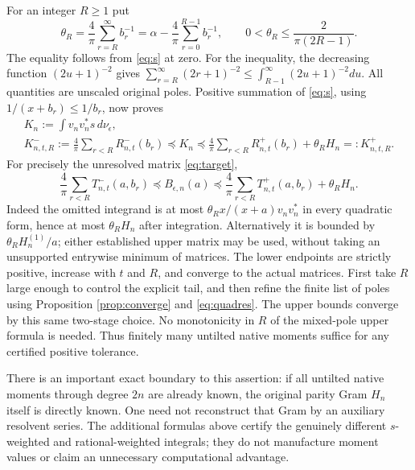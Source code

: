 \documentclass[11pt]{article}
\begin{document}
For an integer $R\ge1$ put
\begin{equation}\label{eq:theta}
 \theta_R=\frac4\pi\sum_{r=R}^\infty b_r^{-1}
 =\alpha-\frac4\pi\sum_{r=0}^{R-1}b_r^{-1},\qquad
 0<\theta_R\le\frac{2}{\pi(2R-1)}.
\end{equation}
The equality follows from \eqref{eq:s} at zero.  For the inequality,
the decreasing function $(2u+1)^{-2}$ gives
$\sum_{r=R}^\infty(2r+1)^{-2}\le\int_{R-1}^\infty(2u+1)^{-2}du$.
All quantities are unscaled original poles.  Positive summation of
\eqref{eq:s}, using $1/(x+b_r)\le1/b_r$, now proves
\begin{equation}\label{eq:tiltKbounds}
 \begin{gathered}
 K_n:=\int v_nv_n^*s\,d\nu_\epsilon,\\
 K_{n,t,R}^-:=\frac4\pi\sum_{r<R}R_{n,t}^-(b_r)
 \preceq K_n\preceq
 \frac4\pi\sum_{r<R}R_{n,t}^+(b_r)+\theta_RH_n
 =:K_{n,t,R}^+.
 \end{gathered}
\end{equation}
For precisely the unresolved matrix \eqref{eq:target},
\begin{equation}\label{eq:tiltBbounds}
 \boxed{\frac4\pi\sum_{r<R}T_{n,t}^-(a,b_r)
 \preceq B_{\epsilon,n}(a)\preceq
 \frac4\pi\sum_{r<R}T_{n,t}^+(a,b_r)+\theta_RH_n.}
\end{equation}
Indeed the omitted integrand is at most
$\theta_R x/(x+a)v_nv_n^*$ in every quadratic form, hence at most
$\theta_RH_n$ after integration.  Alternatively it is bounded by
$\theta_RH_n^{(1)}/a$; either established upper matrix may be used,
without taking an unsupported entrywise minimum of matrices.
The lower endpoints are strictly positive, increase with $t$ and $R$,
and converge to the actual matrices.  First take $R$ large enough to
control the explicit tail, and then refine the finite list of poles
using Proposition \ref{prop:converge} and \eqref{eq:quadres}.  The
upper bounds converge by this same two-stage choice.  No monotonicity
in $R$ of the mixed-pole upper formula is needed.  Thus finitely many
untilted native moments suffice for any certified positive tolerance.

There is an important exact boundary to this assertion: if all
untilted native moments through degree $2n$ are already known, the
original parity Gram $H_n$ itself is directly known.  One need not
reconstruct that Gram by an auxiliary resolvent series.  The additional
formulas above certify the genuinely different $s$-weighted and
rational-weighted integrals; they do not manufacture moment values or
claim an unnecessary computational advantage.
\end{document}
